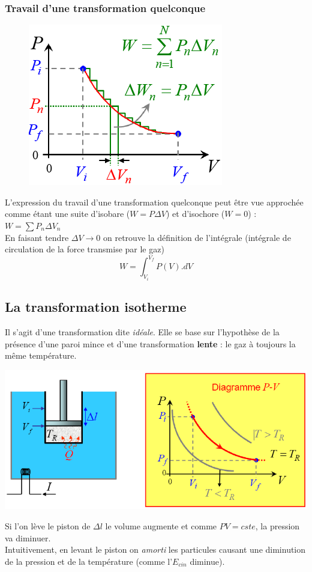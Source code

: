 \documentclass	[11pt, a4paper, openany]{book}
\begin{document}
\subsubsection{Travail d'une transformation quelconque}
\begin{figure}
	\includegraphics[scale=0.34]{th/image12.png}
\end{figure}
L'expression du travail d'une transformation quelconque peut être vue approchée comme étant une suite d'isobare ($W = P\Delta V$) et d'isochore ($W = 0$) : $W = \sum P_n \Delta V_n$\\ En faisant tendre $\Delta V \rightarrow 0$ on retrouve la définition de l'intégrale (intégrale de circulation de la force transmise par le gaz)
\begin{equation}
	W = \int_{V_i}^{V_f} P(V).dV
\end{equation}
\subsection{La transformation isotherme}
Il s'agit d'une transformation dite \textit{idéale}. Elle se base sur l'hypothèse de la présence d'une paroi mince et d'une transformation \textbf{lente} : le gaz à toujours la même température. 
\begin{center}
	\includegraphics[scale=0.3]{th/image13.png}
\end{center}
Si l'on lève le piston de $\Delta l$ le volume augmente et comme $PV=cste$, la pression va diminuer.\\
Intuitivement, en levant le piston on \textit{amorti} les particules causant une diminution de la pression et de la température (comme l'$E_{cin}$ diminue).
\end{document}
